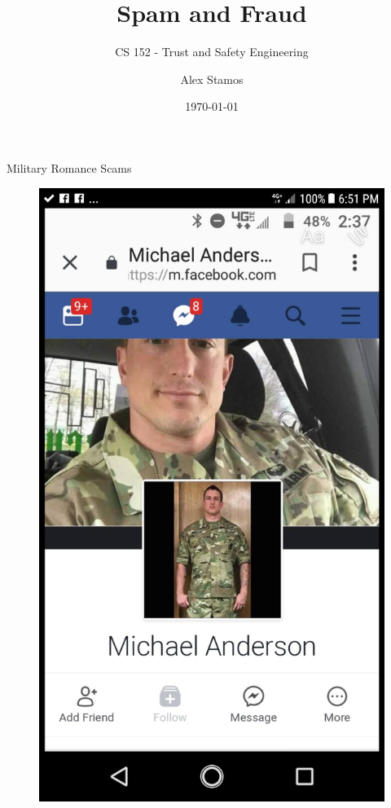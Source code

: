 \documentclass[nobackground,dvipsnames,table]{beamer}
\title{Spam and Fraud}
\subtitle{CS 152 - Trust and Safety Engineering}
\author[A. Stamos]{Alex Stamos}
\institute[SIO]{\large Stanford Internet Observatory}
\date[2022]{\today}
\begin{document}
\coverpage

\begin{frame}
    \titlepage
\end{frame}

\begin{frame}{Military Romance Scams}
    \begin{figure}
        \centering
        \includegraphics[height=0.85\textheight]{military-romance-scam}
    \end{figure}
\end{frame}
\end{document}
